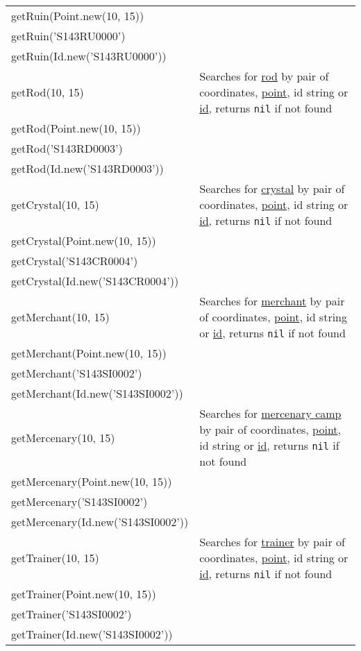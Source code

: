\begin{center}
\begin{tabularx}{\linewidth}{| l | X |}
getRuin(Point.new(10, 15)) &\\
getRuin('S143RU0000') &\\
getRuin(Id.new('S143RU0000')) &\\
\hline
getRod(10, 15) & Searches for \hyperref[Rod]{rod} by pair of coordinates, \hyperref[Point]{point}, id string or \hyperref[Id]{id}, returns \texttt{nil} if not found\\
getRod(Point.new(10, 15)) &\\
getRod('S143RD0003') &\\
getRod(Id.new('S143RD0003')) &\\
\hline
getCrystal(10, 15) & Searches for \hyperref[Crystal]{crystal} by pair of coordinates, \hyperref[Point]{point}, id string or \hyperref[Id]{id}, returns \texttt{nil} if not found\\
getCrystal(Point.new(10, 15)) &\\
getCrystal('S143CR0004') &\\
getCrystal(Id.new('S143CR0004')) &\\
\hline
getMerchant(10, 15) & Searches for \hyperref[Merchant]{merchant} by pair of coordinates, \hyperref[Point]{point}, id string or \hyperref[Id]{id}, returns \texttt{nil} if not found\\
getMerchant(Point.new(10, 15)) &\\
getMerchant('S143SI0002') &\\
getMerchant(Id.new('S143SI0002')) &\\
\hline
getMercenary(10, 15) & Searches for \hyperref[Mercenary]{mercenary camp} by pair of coordinates, \hyperref[Point]{point}, id string or \hyperref[Id]{id}, returns \texttt{nil} if not found\\
getMercenary(Point.new(10, 15)) &\\
getMercenary('S143SI0002') &\\
getMercenary(Id.new('S143SI0002')) &\\
\hline
getTrainer(10, 15) & Searches for \hyperref[Trainer]{trainer} by pair of coordinates, \hyperref[Point]{point}, id string or \hyperref[Id]{id}, returns \texttt{nil} if not found\\
getTrainer(Point.new(10, 15)) &\\
getTrainer('S143SI0002') &\\
getTrainer(Id.new('S143SI0002')) &\\
\hline
\end{tabularx}
\end{center}
